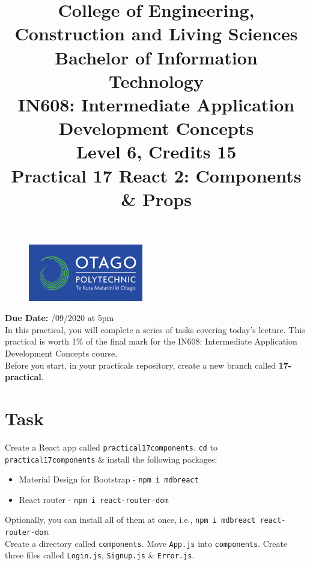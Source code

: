 \documentclass{article}
\author{}
\begin{document}
\begin{figure}
	\centering
	\includegraphics[width=50mm]{./img/logo.png}
\end{figure}

\title{College of Engineering, Construction and Living Sciences\\Bachelor of Information Technology\\IN608: Intermediate Application Development Concepts\\Level 6, Credits 15\\\textbf{Practical 17 React 2: Components \& Props}} 
\date{}
\maketitle

\textbf{Due Date:} /09/2020 at 5pm \\

In this practical, you will complete a series of tasks covering today's lecture. This practical is worth 1\% of the final mark for the IN608: Intermediate Application Development Concepts course. \\

Before you start, in your practicals repository, create a new branch called \textbf{17-practical}.

\section*{Task} 
Create a React app called \texttt{practical17components}. \texttt{cd} to \texttt{practical17components} \& install the following packages:
\begin{itemize}
  \item Material Design for Bootstrap - \texttt{npm i mdbreact}
  \item React router - \texttt{npm i react-router-dom}
\end{itemize}

Optionally, you can install all of them at once, i.e., \texttt{npm i mdbreact react-router-dom}. \\

Create a directory called \texttt{components}. Move \texttt{App.js} into \texttt{components}. Create three files called \texttt{Login.js}, \texttt{Signup.js} \& \texttt{Error.js}. \\
\end{document}
